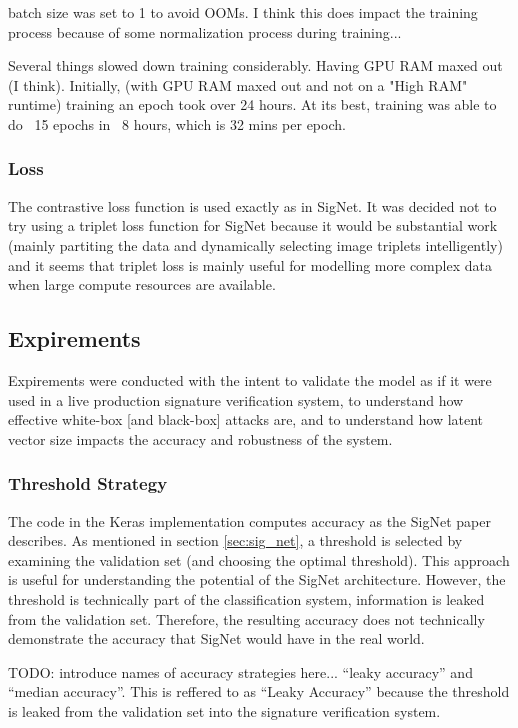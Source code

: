 batch size was set to 1 to avoid OOMs.
I think this does impact the training process because of some normalization process during training...

Several things slowed down training considerably.
Having GPU RAM maxed out (I think).
Initially, (with GPU RAM maxed out and not on a "High RAM" runtime) training an epoch took over 24 hours.
At its best, training was able to do ~15 epochs in ~8 hours, which is 32 mins per epoch.


\subsubsection{Loss}
The contrastive loss function is used exactly as in SigNet\cite{GitHub_sounakdey}.
It was decided not to try using a triplet loss function for SigNet because it would be substantial work (mainly partiting the data and dynamically selecting image triplets intelligently) and it seems that triplet loss is mainly useful for modelling more complex data when large compute resources are available.


\subsection{Expirements}

Expirements were conducted with the intent to validate the model as if it were used in a live production signature verification system, to understand how effective white-box [and black-box] attacks are, and to understand how latent vector size impacts the accuracy and robustness of the system.

\subsubsection{Threshold Strategy}\label{sec:threshold}

The code in the Keras implementation computes accuracy as the SigNet paper describes.
As mentioned in section \ref{sec:sig_net}, a threshold is selected by examining the validation set (and choosing the optimal threshold).
This approach is useful for understanding the potential of the SigNet architecture.
However, the threshold is technically part of the classification system, information is leaked from the validation set.
Therefore, the resulting accuracy does not technically demonstrate the accuracy that SigNet would have in the real world.


TODO: introduce names of accuracy strategies here... ``leaky accuracy'' and ``median accuracy''.
This is reffered to as ``Leaky Accuracy'' because the threshold is leaked from the validation set into the signature verification system.



